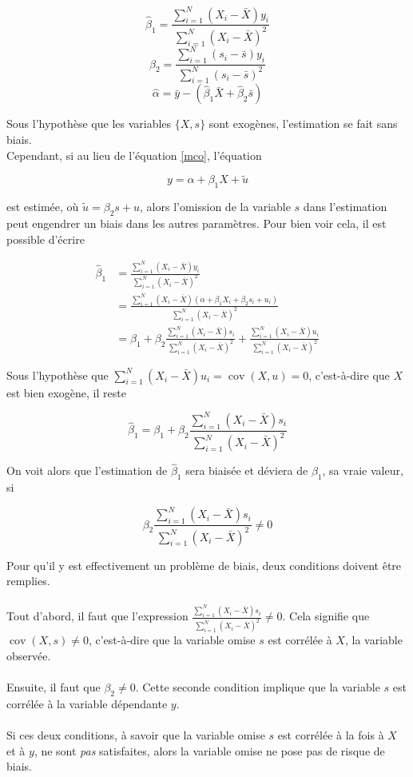 \documentclass{article}
\DeclareMathOperator{\cov}{cov}
\begin{document}
\[\hat{\beta}_1=\frac{\sum_{i=1}^N(X_i-\bar{X})y_i}{\sum_{i=1}^N(X_i-\bar{X})^2}\]
\[\hat{\beta}_2=\frac{\sum_{i=1}^N(s_i-\bar{s})y_i}{\sum_{i=1}^N(s_i-\bar{s})^2}\]
\[\hat{\alpha}=\bar{y}-(\hat{\beta}_1\bar{X}+\hat{\beta}_2\bar{s})\]

Sous l'hypoth\`{e}se que les variables $\{X,s\}$ sont exog\`{e}nes, l'estimation se fait sans biais. 
\\
Cependant, si au lieu de l'\'{e}quation \eqref{mco}, l'\'{e}quation

\begin{equation}
\label{biais}
y=\alpha+\beta_1X+\tilde{u}
\end{equation}

est estim\'{e}e, o\`{u} $\tilde{u}=\beta_2s+u$, alors l'omission de la variable $s$ dans l'estimation peut engendrer un biais dans les autres param\`{e}tres. Pour bien voir cela, il est possible d'\'{e}crire 

\begin{align}
 \hat{\beta}_1 & =\frac{\sum_{i=1}^N(X_i-\bar{X})y_i}{\sum_{i=1}^N(X_i-\bar{X})^2} \nonumber \\
 & = \frac{\sum_{i=1}^N(X_i-\bar{X})(\alpha+\beta_1X_i+\beta_2s_i+u_i)}{\sum_{i=1}^N(X_i-\bar{X})^2} \nonumber \\
 & = \beta_1+ \beta_2\frac{\sum_{i=1}^N(X_i-\bar{X})s_i}{\sum_{i=1}^N(X_i-\bar{X})^2} + \frac{\sum_{i=1}^N(X_i-\bar{X})u_i}{\sum_{i=1}^N(X_i-\bar{X})^2} \nonumber
\end{align}

Sous l'hypoth\`{e}se que $\sum_{i=1}^N(X_i-\bar{X})u_i=\cov(X,u)=0$, c'est-\`{a}-dire que $X$ est bien exog\`{e}ne, il reste

 \[ \hat{\beta}_1 = \beta_1+ \beta_2\frac{\sum_{i=1}^N(X_i-\bar{X})s_i}{\sum_{i=1}^N(X_i-\bar{X})^2}\]

On voit alors que l'estimation de $\hat{\beta}_1$ sera biais\'{e}e et d\'{e}viera de $\beta_1$, sa vraie valeur, si 

\[\beta_2\frac{\sum_{i=1}^N(X_i-\bar{X})s_i}{\sum_{i=1}^N(X_i-\bar{X})^2}\neq 0\]

Pour qu'il y est effectivement un probl\`{e}me de biais, deux conditions doivent \^{e}tre remplies. 
\\
\\
Tout d'abord, il faut que l'expression $\frac{\sum_{i=1}^N(X_i-\bar{X})s_i}{\sum_{i=1}^N(X_i-\bar{X})^2}\neq0$. Cela signifie que $\cov(X,s)\neq0$, c'est-\`{a}-dire que la variable omise $s$ est corr\'{e}l\'{e}e \`{a} $X$, la variable observ\'{e}e. 
\\
\\
Ensuite, il faut que $\beta_2\neq 0$. Cette seconde condition implique que la variable $s$ est corr\'{e}l\'{e}e \`{a} la variable d\'{e}pendante $y$. 
\\
\\
Si ces deux conditions, \`{a} savoir que la variable omise $s$ est corr\'{e}l\'{e}e \`{a} la fois \`{a} $X$ et \`{a} $y$, ne sont \textit{pas} satisfaites, alors la variable omise ne pose pas de risque de biais.

\newpage



\end{document}
